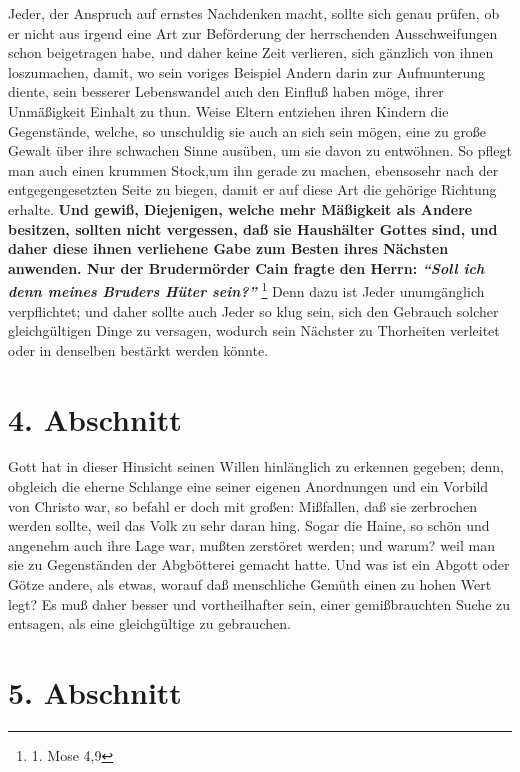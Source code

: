Jeder, der Anspruch auf ernstes Nachdenken macht, sollte sich genau prüfen, ob
er nicht aus irgend eine Art zur Beförderung der herrschenden Ausschweifungen
schon beigetragen habe, und daher keine Zeit verlieren, sich gänzlich von ihnen
loszumachen, damit, wo sein voriges Beispiel Andern darin zur Aufmunterung
diente, sein besserer Lebenswandel auch den Einfluß haben möge, ihrer
Unmäßigkeit Einhalt zu thun. Weise Eltern
entziehen ihren Kindern die
Gegenstände, welche, so unschuldig sie auch an sich sein mögen, eine zu große
Gewalt über ihre schwachen Sinne ausüben, um sie davon zu entwöhnen. So pflegt
man auch einen krummen Stock,um ihn gerade zu machen, ebensosehr nach der
entgegengesetzten Seite zu biegen, damit er auf diese Art die gehörige Richtung
erhalte. \textbf{Und gewiß, Diejenigen, welche mehr
Mäßigkeit als Andere besitzen,
sollten nicht vergessen, daß sie Haushälter Gottes sind, und daher diese ihnen
verliehene Gabe zum Besten ihres Nächsten anwenden. Nur der Brudermörder
Cain
fragte den Herrn:
\textit{"`Soll ich denn meines Bruders Hüter sein?"'}}
\footnote{1. Mose 4,9}
Denn dazu ist Jeder unumgänglich verpflichtet; und daher sollte auch Jeder
so klug sein, sich den Gebrauch solcher gleichgültigen Dinge zu versagen,
wodurch sein Nächster zu Thorheiten verleitet oder in denselben bestärkt werden
könnte.

\section{4. Abschnitt} \label{kap18_ab4}

Gott hat in dieser Hinsicht seinen Willen hinlänglich zu erkennen gegeben; denn,
obgleich die eherne Schlange eine seiner eigenen Anordnungen und
ein Vorbild von
Christo war, so befahl er doch mit großen: Mißfallen, daß sie zerbrochen werden
sollte, weil das Volk zu sehr daran hing. Sogar die Haine, so schön und angenehm
auch ihre Lage war, mußten zerstöret werden; und warum? weil man sie zu
Gegenständen der Abgbötterei gemacht hatte. Und was ist ein
Abgott oder Götze
andere, als etwas, worauf daß menschliche Gemüth einen zu hohen Wert legt? Es
muß daher besser und vortheilhafter sein, einer gemißbrauchten Suche zu
entsagen, als eine gleichgültige zu gebrauchen.

\section{5. Abschnitt} \label{kap18_ab5}

